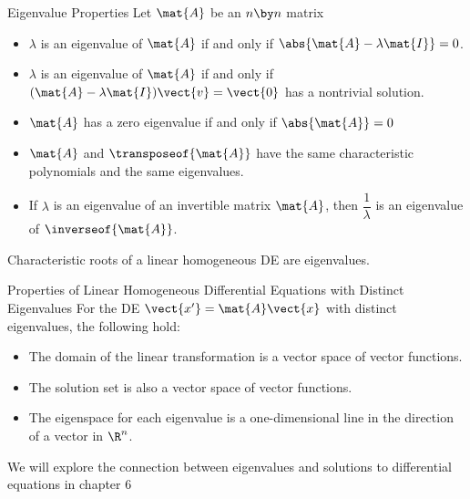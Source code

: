 \documentclass{beamer}
\begin{document}
\begin{frame}
\begin{block}{Eigenvalue Properties}
Let $\mat{A}$ be an $n\by n$ matrix
\begin{itemize}[<+- | alert@+>]
\item $\lambda$ is an eigenvalue of $\mat{A}$ if and only if $\abs{\mat{A}-\lambda\mat{I}}=0$.
\item $\lambda$ is an eigenvalue of $\mat{A}$ if and only if $(\mat{A}-\lambda\mat{I})\vect{v}=\vect{0}$ has a nontrivial solution.
\item $\mat{A}$ has a zero eigenvalue if and only if $\abs{\mat{A}}=0$
\item $\mat{A}$ and $\transposeof{\mat{A}}$ have the same characteristic polynomials and the same eigenvalues.
\item If $\lambda$ is an eigenvalue of an invertible matrix $\mat{A}$, then $\dfrac{1}{\lambda}$ is an eigenvalue of $\inverseof{\mat{A}}$.
\end{itemize}
\end{block}
\end{frame}

\begin{frame}
\onslide<+->
\begin{block}{}
Characteristic roots of a linear homogeneous DE are eigenvalues.
\end{block}
\onslide<+->
\begin{block}{Properties of Linear Homogeneous Differential Equations with Distinct Eigenvalues}
For the DE $\vect{x^\prime}=\mat{A}\vect{x}$ with distinct eigenvalues, the following hold:
\begin{itemize}[<+- | alert@+>]
\item The domain of the linear transformation is a vector space of vector functions.
\item The solution set is also a vector space of vector functions.
\item The eigenspace for each eigenvalue is a one-dimensional line in the direction of a vector in $\R^n$.
\end{itemize}
\end{block}
\onslide<+->
\begin{block}{}
We will explore the connection between eigenvalues and solutions to differential equations in chapter 6
\end{block}
\end{frame}
\end{document}
